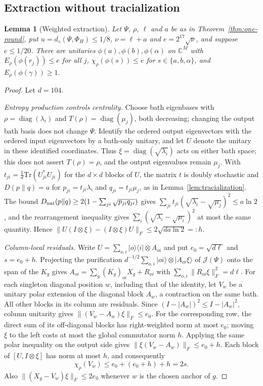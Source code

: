 \documentclass[11pt,a4paper]{article}
\theoremstyle{plain}
\newtheorem{lemma}[theorem]{Lemma}
\theoremstyle{definition}
\theoremstyle{remark}
\DeclareMathOperator{\diag}{diag}
\newcommand{\ddia}{d_\diamond}
\begin{document}
\subsection{Extraction without tracialization}

\begin{lemma}[Weighted extraction]\label{lem:weighted-extraction}
Let $\Psi$, $\rho$, $\ell$ and $a$ be as in Theorem~\ref{thm:one-round}, put $u=\ddia(\Psi,\Phi_H)\le1/8$, $\nu=\ell+a$ and
$e=2^{17}\sqrt\nu$, and suppose $e\le1/20$. There are unitaries $\phi(a),\phi(b),\phi(\alpha)$ on $\mathbb C^M$ with $E_\rho(\phi(r_j))\le e$
for all $j$, $\chi_\rho(\phi(s))\le e$ for $s\in\{a,b,\alpha\}$, and $E_\rho(\phi(\gamma))\ge1$.
\end{lemma}

\begin{proof}
Let $d=104$.

\emph{Entropy production controls centrality.} Choose bath eigenbases with $\rho=\diag(\lambda_i)$ and $T(\rho)=\diag(\mu_j)$, both decreasing;
changing the output bath basis does not change $\Psi$. Identify the ordered output eigenvectors with the ordered input eigenvectors by a bath-only unitary, and let $U$ denote the unitary in these identified coordinates.
Thus $\xi=\diag(\sqrt{\lambda_i})$ acts on either bath space; this does not assert $T(\rho)=\rho$, and the output eigenvalues remain $\mu_j$.
With $t_{ji}=\frac1d\mathrm{Tr}(U_{ji}^*U_{ji})$ for the $d\times d$ blocks of $U$, the
matrix $t$ is doubly stochastic and $D(p\|q)=a$ for $p_{ji}=t_{ji}\lambda_i$ and $q_{ji}=t_{ji}\mu_j$, as in Lemma~\ref{lem:tracialization}. The
bound $D_{\rm nat}(p\|q)\ge2(1-\sum_{ji}\sqrt{p_{ji}q_{ji}})$ gives $\sum_{ji}t_{ji}(\sqrt{\lambda_i}-\sqrt{\mu_j})^2\le a\ln2$, and the rearrangement
inequality gives $\sum_i(\sqrt{\lambda_i}-\sqrt{\mu_i})^2$ at most the same quantity. Hence
$\|U(I\otimes\xi)-(I\otimes\xi)U\|_F\le2\sqrt{da\ln2}=:h$.

\emph{Column-local residuals.} Write $U=\sum_{o,i}|o\rangle\langle i|\otimes A_{oi}$ and put $e_0=\sqrt{d\ell}$ and $s=e_0+h$. Projecting the
purification $d^{-1/2}\sum_{o,i}|oi\rangle\otimes|A_{oi}\xi\rangle$ of $\mathcal J(\Psi)$ onto the span of the $K_g$ gives
$A_{oi}=\sum_g(K_g)_{oi}X_g+R_{oi}$ with $\sum_{o,i}\|R_{oi}\xi\|_F^2=d\ell$. For each singleton diagonal position $w$, including that of the
identity, let $V_w$ be a unitary polar extension of the diagonal block $A_w$, a contraction on the same bath.
All other blocks in its column are residuals. Since $(I-|A_w|)^2\le I-|A_w|^2$, column unitarity gives
$\|(V_w-A_w)\xi\|_F\le e_0$. For the corresponding row, the direct sum of its off-diagonal blocks has right-weighted norm at most $e_0$;
moving $\xi$ to the left costs at most the global commutator norm $h$. Applying the same polar inequality on the output side gives
$\|\xi(V_w-A_w)\|_F\le e_0+h$. Each block of $[U,I\otimes\xi]$ has norm at most $h$, and consequently
\[
\chi_\rho(V_w)\le e_0+(e_0+h)+h=2s.
\]
Also $\|(X_g-V_w)\xi\|_F\le2e_0$ whenever $w$ is the chosen anchor of $g$.


\end{proof}
\end{document}
